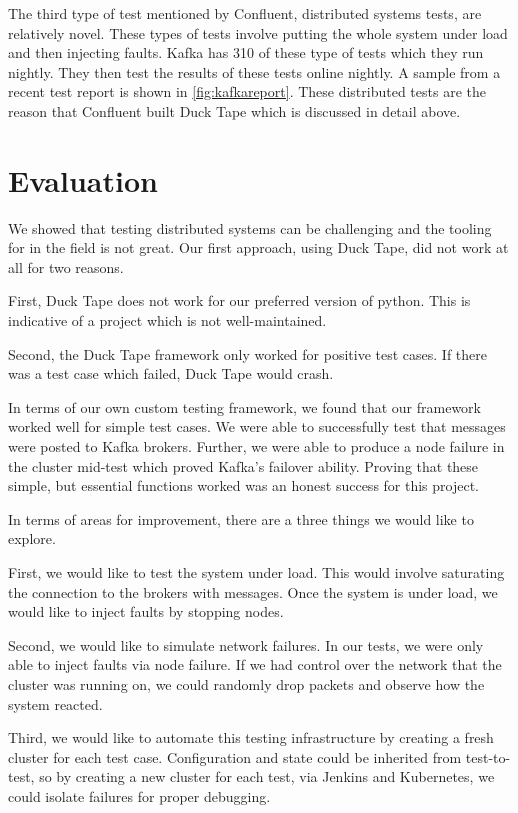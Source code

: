 \begin{multicols}{2}
The third type of test mentioned by Confluent, distributed systems tests, are relatively novel.
These types of tests involve putting the whole system under load and then injecting faults.
Kafka has 310 of these type of tests which they run nightly.
They then test the results of these tests online nightly.
A sample from a recent test report is shown in \ref{fig:kafkareport}.
These distributed tests are the reason that Confluent built Duck Tape which is discussed in detail above.


\section{Evaluation}

We showed that testing distributed systems can be challenging and the tooling for in the field is not great.
Our first approach, using Duck Tape, did not work at all for two reasons.

First, Duck Tape does not work for our preferred version of python.
This is indicative of a project which is not well-maintained.

Second, the Duck Tape framework only worked for positive test cases.
If there was a test case which failed, Duck Tape would crash.

In terms of our own custom testing framework, we found that our framework worked well for simple test cases.
We were able to successfully test that messages were posted to Kafka brokers.
Further, we were able to produce a node failure in the cluster mid-test which proved Kafka's failover ability.
Proving that these simple, but essential functions worked was an honest success for this project.

In terms of areas for improvement, there are a three things we would like to explore.

First, we would like to test the system under load.
This would involve saturating the connection to the brokers with messages.
Once the system is under load, we would like to inject faults by stopping nodes.

Second, we would like to simulate network failures.
In our tests, we were only able to inject faults via node failure.
If we had control over the network that the cluster was running on, we could randomly drop packets and observe how the system reacted.

Third, we would like to automate this testing infrastructure by creating a fresh cluster for each test case.
Configuration and state could be inherited from test-to-test, so by creating a new cluster for each test, via Jenkins and Kubernetes, we could isolate failures for proper debugging.


\end{multicols}
